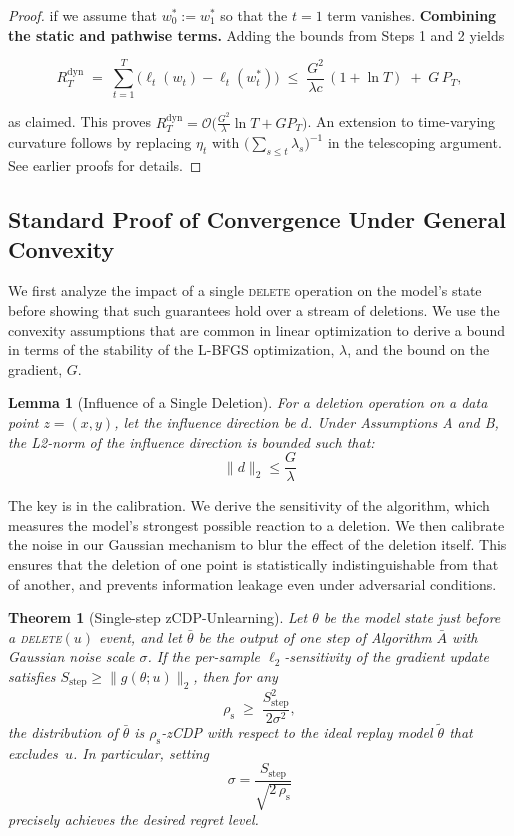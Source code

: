 \documentclass{article}
\theoremstyle{ssltheorem}
\newtheorem{theorem}{Theorem}
\newtheorem{lemma}{Lemma}
\begin{document}
\begin{proof}
if we assume that $w_{0}^{*}:=w_{1}^{*}$ so that the $t=1$ term vanishes.
\textbf{Combining the static and pathwise terms.}
Adding the bounds from Steps 1 and 2 yields

$$
  R_{T}^{\mathrm{dyn}}
  \;=\;
\sum_{t=1}^{T}\bigl(\ell_{t}(w_{t})-\ell_{t}(w_{t}^{*})\bigr)
  \;\le\;
  \frac{G^{2}}{\lambda c}\,(1+\ln T)
  \;+\;
  G\,P_{T},
$$

as claimed. This proves
$R_{T}^{\mathrm{dyn}}=\mathcal{O}\!\bigl(\tfrac{G^{2}}{\lambda}\ln T+G P_{T}\bigr)$.
An extension to time-varying curvature follows by replacing $\eta_{t}$ with
$\bigl(\sum_{s\le t}\lambda_{s}\bigr)^{-1}$ in the telescoping argument. See earlier proofs for details.
\end{proof}

\subsection{Standard Proof of Convergence Under General Convexity}

We first analyze the impact of a single \textsc{delete} operation on the model's state before showing that such guarantees hold over a stream of deletions.
We use the convexity assumptions that are common in linear optimization to derive a bound in terms of the stability of the L-BFGS optimization, $\lambda$, and the bound on the gradient, $G$.
\begin{lemma}[Influence of a Single Deletion]
\label{lem:bounded-influence}
For a deletion operation on a data point $z=(x, y)$, let the influence direction be $d$.
Under Assumptions A and B, the L2-norm of the influence direction is bounded such that:
$$
\|d\|_{2} \leq \frac{G}{\lambda}
$$
\end{lemma}

The key is in the calibration.
We derive the sensitivity of the algorithm, which measures the model's strongest possible reaction to a deletion.
We then calibrate the noise in our Gaussian mechanism to blur the effect of the deletion itself.
This ensures that the deletion of one point is statistically indistinguishable from that of another, and prevents information leakage even under adversarial conditions.
\begin{theorem}[Single-step zCDP-Unlearning]
\label{thm:single-step-zcdp}
Let $\theta$ be the model state just before a
\textsc{delete}$(u)$ event, and let
$\bar\theta$ be the output of one step of Algorithm $\bar{A}$
with Gaussian noise scale $\sigma$.
If the per-sample $\ell_{2}$-sensitivity of the gradient update satisfies
$S_{\text{step}} \ge \|g(\theta;u)\|_{2}$, then for any
$$
  \rho_{\mathrm{s}}
  \;\ge\;\frac{S_{\text{step}}^{2}}{2\sigma^{2}},
$$
the distribution of $\bar{\theta}$ is $\rho_{\mathrm{s}}$-zCDP with
respect to the ideal replay model $\tilde{\theta}$ that excludes~$u$.
In particular, setting
$$
  \sigma
  =\dfrac{S_{\text{step}}}{\sqrt{2\,\rho_{\mathrm{s}}}}
$$ precisely
achieves the desired regret level.
\end{theorem}
\end{document}
